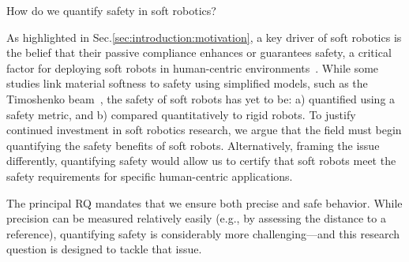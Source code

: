 \begin{researchquestion}\label{rq:soft_robotic_safety}
    How do we quantify safety in soft robotics?
\end{researchquestion}
As highlighted in Sec.\ref{sec:introduction:motivation}, a key driver of soft robotics is the belief that their passive compliance enhances or guarantees safety, a critical factor for deploying soft robots in human-centric environments~\citep{rus2015design, mengaldo2022concise}. While some studies link material softness to safety using simplified models, such as the Timoshenko beam~\citep{abidi2017intrinsic}, the safety of soft robots has yet to be: a) quantified using a safety metric, 
and b) compared quantitatively to rigid robots.
To justify continued investment in soft robotics research, we argue that the field must begin quantifying the safety benefits of soft robots. Alternatively, framing the issue differently, quantifying safety would allow us to certify that soft robots meet the safety requirements for specific human-centric applications.

The principal \gls{RQ} mandates that we ensure both precise and safe behavior. While precision can be measured relatively easily (e.g., by assessing the distance to a reference), quantifying safety is considerably more challenging—and this research question is designed to tackle that issue.

